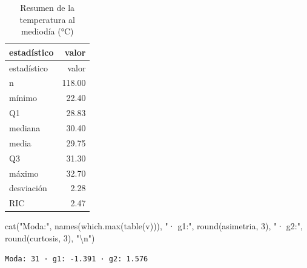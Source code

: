\documentclass[oneside, openany, fontset=libertinus]{mitthesis}
\newenvironment{Shaded}{\begin{snugshade}}{\end{snugshade}}
\newcommand{\DecValTok}[1]{\textcolor[rgb]{0.68,0.00,0.00}{#1}}
\newcommand{\FunctionTok}[1]{\textcolor[rgb]{0.28,0.35,0.67}{#1}}
\newcommand{\NormalTok}[1]{\textcolor[rgb]{0.00,0.23,0.31}{#1}}
\newcommand{\SpecialCharTok}[1]{\textcolor[rgb]{0.37,0.37,0.37}{#1}}
\newcommand{\StringTok}[1]{\textcolor[rgb]{0.13,0.47,0.30}{#1}}
\begin{document}
\begin{longtable}[]{@{}lr@{}}
\caption{Resumen de la temperatura al mediodía (°C)}\tabularnewline
\toprule\noalign{}
estadístico & valor \\
\midrule\noalign{}
\endfirsthead
\toprule\noalign{}
estadístico & valor \\
\midrule\noalign{}
\endhead
\bottomrule\noalign{}
\endlastfoot
n & 118.00 \\
mínimo & 22.40 \\
Q1 & 28.83 \\
mediana & 30.40 \\
media & 29.75 \\
Q3 & 31.30 \\
máximo & 32.70 \\
desviación & 2.28 \\
RIC & 2.47 \\
\end{longtable}

\begin{Shaded}
\begin{Highlighting}[]
\FunctionTok{cat}\NormalTok{(}\StringTok{"Moda:"}\NormalTok{, }\FunctionTok{names}\NormalTok{(}\FunctionTok{which.max}\NormalTok{(}\FunctionTok{table}\NormalTok{(v))), }\StringTok{"· g1:"}\NormalTok{, }\FunctionTok{round}\NormalTok{(asimetria, }\DecValTok{3}\NormalTok{),}
    \StringTok{"· g2:"}\NormalTok{, }\FunctionTok{round}\NormalTok{(curtosis, }\DecValTok{3}\NormalTok{), }\StringTok{"}\SpecialCharTok{\textbackslash{}n}\StringTok{"}\NormalTok{)}
\end{Highlighting}
\end{Shaded}

\begin{verbatim}
Moda: 31 · g1: -1.391 · g2: 1.576 
\end{verbatim}
\end{document}
